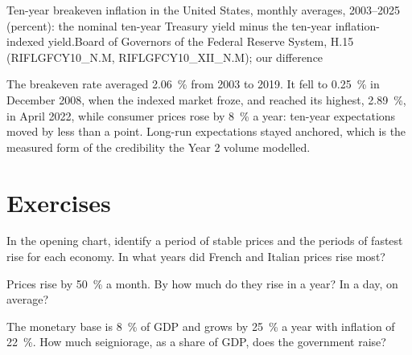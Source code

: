 \begin{omchart}{Ten-year breakeven inflation in the United States, monthly averages,
2003--2025 (percent): the nominal ten-year Treasury yield minus the ten-year
inflation-indexed yield.}{Board of Governors of the Federal Reserve System, H.15
(RIFLGFCY10\_N.M, RIFLGFCY10\_XII\_N.M); our difference}
\end{omchart}

The breakeven rate averaged 2.06~\% from 2003 to 2019. It fell to 0.25~\% in December
2008, when the indexed market froze, and reached its highest, 2.89~\%, in April
2022, while consumer prices rose by 8~\% a year: ten-year expectations moved by less
than a point. Long-run expectations stayed anchored, which is the measured form of
the credibility the Year 2 volume modelled.

\section{Exercises}\label{sec:b3:inflation-evidence:exercises}

\begin{exercise}[$\star$]\label{exo:b3:inflation-evidence:1}
In the opening chart, identify a period of stable prices and the periods of fastest
rise for each economy. In what years did French and Italian prices rise most?
\end{exercise}

\begin{exercise}[$\star$]\label{exo:b3:inflation-evidence:2}
Prices rise by 50~\% a month. By how much do they rise in a year? In a day, on average?
\end{exercise}

\begin{exercise}[$\star$]\label{exo:b3:inflation-evidence:3}
The monetary base is 8~\% of GDP and grows by 25~\% a year with inflation of 22~\%. How
much seigniorage, as a share of GDP, does the government raise?
\end{exercise}


